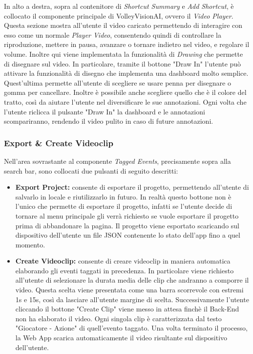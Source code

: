 In alto a destra, sopra al contenitore di \textit{Shortcut Summary} e \textit{Add Shortcut}, è collocato il componente principale di VolleyVisionAI, ovvero il \textit{Video Player}. Questa sezione mostra all'utente il video caricato permettendo di interagire con esso come un normale \textit{Player Video}, consentendo quindi di controllare la riproduzione, mettere in pausa, avanzare o tornare indietro nel video, e regolare il volume.  Inoltre qui viene implementata la funzionalità di \textit{Drawing} che permette di disegnare sul video. In particolare, tramite il bottone "Draw In" l'utente può attivare la funzionalità di disegno che implementa una dashboard molto semplice.  Quest'ultima permette all'utente di scegliere se usare penna per disegnare o gomma per cancellare. Inoltre è possibile anche scegliere quello che è il colore del tratto, così da aiutare l'utente nel diversificare le sue annotazioni. Ogni volta che l'utente riclicca il pulsante "Draw In" la dashboard e le annotazioni scompariranno, rendendo il video pulito in caso di future annotazioni.

\subsubsection{Export \& Create Videoclip}

Nell'area sovrastante al componente \textit{Tagged Events}, precisamente sopra alla search bar, sono collocati due pulsanti di seguito descritti:
\begin{itemize}
    \item \textbf{Export Project:} consente di esportare il progetto, permettendo all'utente di salvarlo in locale e riutilizzarlo in futuro. In realtà questo bottone non è l'unico che permette di esportare il progetto, infatti se l'utente decide di tornare al menu principale gli verrà richiesto se vuole esportare il progetto prima di abbandonare la pagina. Il progetto viene esportato scaricando sul dispositivo dell'utente un file JSON contenente lo stato dell'app fino a quel momento.
    \item \textbf{Create Videoclip:} consente di creare videoclip in maniera automatica elaborando gli eventi taggati in precedenza. In particolare viene richiesto all'utente di selezionare la durata media delle clip che andranno a comporre il video. Questa scelta viene presentata come una barra scorrevole con estremi 1s e 15s, così da lasciare all'utente margine di scelta. Successivamente l'utente cliccando il bottone "Create Clip" viene messo in attesa finchè il Back-End non ha elaborato il video. Ogni singola clip è caratterizzata dal testo "Giocatore - Azione" di quell'evento taggato. Una volta terminato il processo, la Web App scarica automaticamente il video risultante sul dispositivo dell'utente.
\end{itemize}

